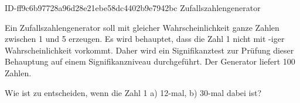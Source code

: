 \begin{exercise}
      {ID-ff9c6b97728a96d28e21ebe58dc4402b9e7942bc}
      {Zufallszahlengenerator}
  \ifproblem\problem\par
    Ein Zufallszahlengenerator soll mit gleicher Wahrscheinlichkeit ganze
    Zahlen zwischen 1 und 5 erzeugen. Es wird behauptet, dass die Zahl 1
    nicht mit -iger Wahrscheinlichkeit vorkommt. Daher wird ein
    Signifikanztest zur Prüfung dieser Behauptung auf einem Signifikanzniveau
     durchgeführt. Der Generator liefert 100 Zahlen.\par
    Wie ist zu entscheiden, wenn die Zahl 1 a) 12-mal, b) 30-mal dabei ist?
  \fi
\end{exercise}
